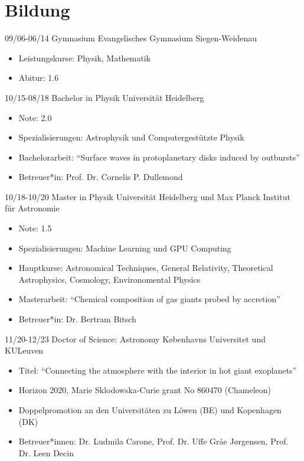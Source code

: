 \documentclass[]{friggeri-cv}
\begin{document}
\section{Bildung}
\begin{entrylist}
  \entry
    {09/06-06/14}
    {Gymnasium}
    {Evangelisches Gymnasium Siegen-Weidenau}
    {\begin{itemize}\vspace{-3mm}
		\item Leistungskurse: Physik, Mathematik
		\item Abitur: 1.6
	\end{itemize}}
  \entry
    {10/15-08/18}
    {Bachelor in Physik}
    {Universität Heidelberg}
    {\begin{itemize}\vspace{-3mm}
    	\item Note: 2.0
    	\item Spezialisierungen: Astrophysik und Computergestützte Physik
    	\item Bachelorarbeit: \enquote{Surface waves in protoplanetary disks induced by outbursts}
    	\item Betreuer*in: Prof. Dr. Cornelis P. Dullemond
    \end{itemize}
	}
  \entry
    {10/18-10/20}
    {Master in Physik}
    {Universität Heidelberg und Max Planck Institut für Astronomie}
    {\begin{itemize}\vspace{-3mm}
    	\item Note: 1.5
    	\item Spezialisierungen: Machine Learning und GPU Computing
    	\item Hauptkurse: Astronomical Techniques, General Relativity, Theoretical Astrophysics, Cosmology, Environomental Physics
    	\item Masterarbeit: \enquote{Chemical composition of gas giants probed by accretion}
    	\item Betreuer*in: Dr. Bertram Bitsch
    \end{itemize}
    }
  \entry    
    {11/20-12/23}
    {Doctor of Science: Astronomy}
    {K{\o}benhavns Universitet und KULeuven}
    {\begin{itemize}\vspace{-3mm}
    \item Titel: \enquote{Connecting the atmosphere with the interior in hot giant exoplanets}
    \item Horizon 2020, Marie Sklodowska-Curie grant No 860470 (Chameleon)
    \item Doppelpromotion an den Universitäten zu Löwen (BE) und Kopenhagen (DK)
    \item Betreuer*innen: Dr. Ludmila Carone, Prof. Dr. Uffe Gråe Jørgensen, Prof. Dr. Leen Decin
    \end{itemize}    
	}
	\\
\end{entrylist}
\end{document}
